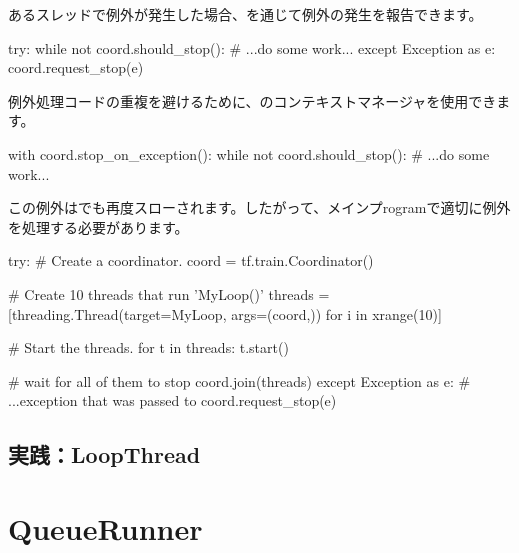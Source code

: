 \begin{content}
あるスレッドで例外が発生した場合、を通じて例外の発生を報告できます。

\begin{leftbar}
\begin{python}
try:
  while not coord.should_stop():
    # ...do some work...
except Exception as e:
  coord.request_stop(e)
\end{python}
\end{leftbar}

例外処理コードの重複を避けるために、のコンテキストマネージャを使用できます。

\begin{leftbar}
\begin{python}
with coord.stop_on_exception():
  while not coord.should_stop():
    # ...do some work...
\end{python}
\end{leftbar}

この例外はでも再度スローされます。したがって、メインプrogramで適切に例外を処理する必要があります。

\begin{leftbar}
\begin{python}
try:
  # Create a coordinator.
  coord = tf.train.Coordinator()

  # Create 10 threads that run 'MyLoop()'
  threads = [threading.Thread(target=MyLoop, args=(coord,)) 
            for i in xrange(10)]

  # Start the threads.
  for t in threads:
    t.start()

  # wait for all of them to stop
  coord.join(threads)
except Exception as e:
  # ...exception that was passed to coord.request\_stop(e)
\end{python}
\end{leftbar}

\subsection{実践：LoopThread}

\end{content}

\section{QueueRunner}

